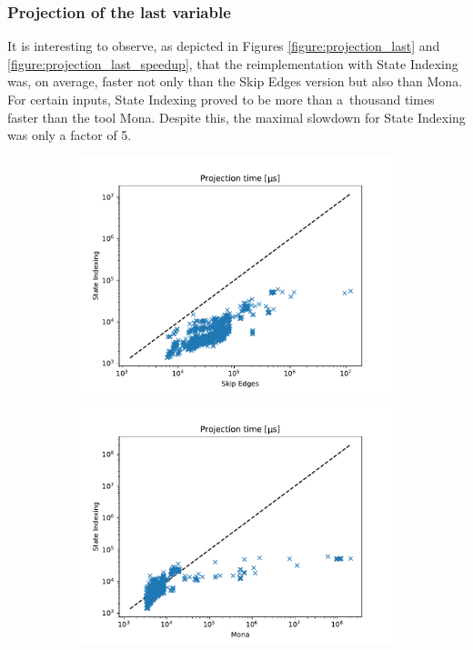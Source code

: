 \documentclass[pdflatex,sn-mathphys-num]{sn-jnl}%
\theoremstyle{thmstyleone}%
\theoremstyle{thmstyletwo}%
\theoremstyle{thmstylethree}%
\begin{document}
        \subsubsection*{Projection of the last variable}
            It is interesting to observe, as depicted in Figures \ref{figure:projection_last} and \ref{figure:projection_last_speedup}, that the reimplementation with State Indexing was, on average, faster not only than the Skip Edges version but also than Mona. For certain inputs, State Indexing proved to be more than a~thousand times faster than the tool Mona. Despite this, the maximal slowdown for State Indexing was only a factor of 5.
            \begin{figure}[h!]
                \centering
                \captionsetup[subfigure]{justification=centering}
                \begin{subfigure}{0.49\textwidth}
                    \includegraphics[width=\textwidth]{Figures/projection-last-mata.pdf}
                \end{subfigure}
                \begin{subfigure}{0.49\textwidth}
                    \includegraphics[width=\textwidth]{Figures/projection-last-mona.pdf}

\end{subfigure}
\end{figure}
\end{document}

